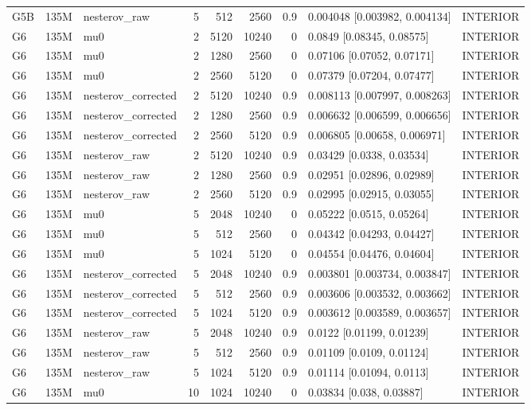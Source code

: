 \begin{longtable}{lllrrrrll}
G5B & 135M & nesterov\_raw & 5 & 512 & 2560 & 0.9 & 0.004048 [0.003982, 0.004134] & INTERIOR \\
G6 & 135M & mu0 & 2 & 5120 & 10240 & 0 & 0.0849 [0.08345, 0.08575] & INTERIOR \\
G6 & 135M & mu0 & 2 & 1280 & 2560 & 0 & 0.07106 [0.07052, 0.07171] & INTERIOR \\
G6 & 135M & mu0 & 2 & 2560 & 5120 & 0 & 0.07379 [0.07204, 0.07477] & INTERIOR \\
G6 & 135M & nesterov\_corrected & 2 & 5120 & 10240 & 0.9 & 0.008113 [0.007997, 0.008263] & INTERIOR \\
G6 & 135M & nesterov\_corrected & 2 & 1280 & 2560 & 0.9 & 0.006632 [0.006599, 0.006656] & INTERIOR \\
G6 & 135M & nesterov\_corrected & 2 & 2560 & 5120 & 0.9 & 0.006805 [0.00658, 0.006971] & INTERIOR \\
G6 & 135M & nesterov\_raw & 2 & 5120 & 10240 & 0.9 & 0.03429 [0.0338, 0.03534] & INTERIOR \\
G6 & 135M & nesterov\_raw & 2 & 1280 & 2560 & 0.9 & 0.02951 [0.02896, 0.02989] & INTERIOR \\
G6 & 135M & nesterov\_raw & 2 & 2560 & 5120 & 0.9 & 0.02995 [0.02915, 0.03055] & INTERIOR \\
G6 & 135M & mu0 & 5 & 2048 & 10240 & 0 & 0.05222 [0.0515, 0.05264] & INTERIOR \\
G6 & 135M & mu0 & 5 & 512 & 2560 & 0 & 0.04342 [0.04293, 0.04427] & INTERIOR \\
G6 & 135M & mu0 & 5 & 1024 & 5120 & 0 & 0.04554 [0.04476, 0.04604] & INTERIOR \\
G6 & 135M & nesterov\_corrected & 5 & 2048 & 10240 & 0.9 & 0.003801 [0.003734, 0.003847] & INTERIOR \\
G6 & 135M & nesterov\_corrected & 5 & 512 & 2560 & 0.9 & 0.003606 [0.003532, 0.003662] & INTERIOR \\
G6 & 135M & nesterov\_corrected & 5 & 1024 & 5120 & 0.9 & 0.003612 [0.003589, 0.003657] & INTERIOR \\
G6 & 135M & nesterov\_raw & 5 & 2048 & 10240 & 0.9 & 0.0122 [0.01199, 0.01239] & INTERIOR \\
G6 & 135M & nesterov\_raw & 5 & 512 & 2560 & 0.9 & 0.01109 [0.0109, 0.01124] & INTERIOR \\
G6 & 135M & nesterov\_raw & 5 & 1024 & 5120 & 0.9 & 0.01114 [0.01094, 0.0113] & INTERIOR \\
G6 & 135M & mu0 & 10 & 1024 & 10240 & 0 & 0.03834 [0.038, 0.03887] & INTERIOR \\

\end{longtable}
